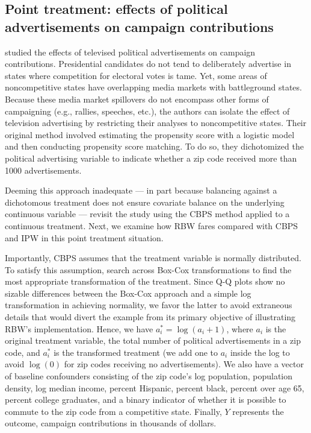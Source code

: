 \hypertarget{point-treatment-example}{%
\subsection{Point treatment: effects of political advertisements on
campaign contributions}\label{point-treatment-example}}

\citet{urbanDollarsSidewalkShould2014a} studied the effects of televised
political advertisements on campaign contributions. Presidential
candidates do not tend to deliberately advertise in states where
competition for electoral votes is tame. Yet, some areas of
noncompetitive states have overlapping media markets with battleground
states. Because these media market spillovers do not encompass other
forms of campaigning (e.g., rallies, speeches, etc.), the authors can
isolate the effect of television advertising by restricting their
analyses to noncompetitive states. Their original method involved
estimating the propensity score with a logistic model and then
conducting propensity score matching. To do so, they dichotomized the
political advertising variable to indicate whether a zip code received
more than 1000 advertisements.

Deeming this approach inadequate --- in part because balancing against a
dichotomous treatment does not ensure covariate balance on the
underlying continuous variable ---
\citet{fongCovariateBalancingPropensity2018} revisit the study using the
CBPS method applied to a continuous treatment. Next, we examine how RBW
fares compared with CBPS and IPW in this point treatment situation.

Importantly, CBPS assumes that the treatment variable is normally
distributed. To satisfy this assumption,
\citet{fongCovariateBalancingPropensity2018} search across Box-Cox
transformations to find the most appropriate transformation of the
treatment. Since Q-Q plots show no sizable differences between the
Box-Cox approach and a simple log transformation in achieving normality,
we favor the latter to avoid extraneous details that would divert the
example from its primary objective of illustrating RBW's implementation.
Hence, we have \(a_{i}^{*}=\log(a_{i}+1)\), where \(a_{i}\) is the
original treatment variable, the total number of political
advertisements in a zip code, and \(a_{i}^{*}\) is the transformed
treatment (we add one to \(a_{i}\) inside the log to avoid \(\log(0)\)
for zip codes receiving no advertisements). We also have a vector of
baseline confounders consisting of the zip code's log population,
population density, log median income, percent Hispanic, percent black,
percent over age 65, percent college graduates, and a binary indicator
of whether it is possible to commute to the zip code from a competitive
state. Finally, \(Y\) represents the outcome, campaign contributions in
thousands of dollars.

